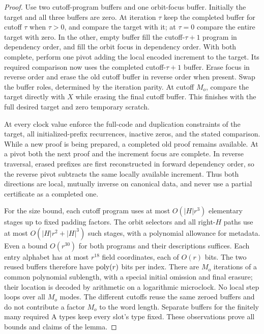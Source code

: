 \begin{proof}
Use two cutoff-program buffers and one orbit-focus buffer.
Initially the target and all three buffers are zero.
At iteration $\tau$ keep the completed buffer for cutoff $\tau$
when $\tau>0$, and compare the target with it; at $\tau=0$ compare
the entire target with zero.  In the other, empty buffer fill the
cutoff-$\tau+1$ program in dependency order, and fill the orbit focus
in dependency order.  With both complete, perform one pivot adding
the local encoded increment to the target.  Its required comparison
now uses the completed cutoff-$\tau+1$ buffer.  Erase focus in reverse
order and erase the old cutoff buffer in reverse order when present.
Swap the buffer roles, determined by the iteration parity.
At cutoff $M_o$, compare the target directly with $X$ while erasing
the final cutoff buffer.  This finishes with the full desired target
and zero temporary scratch.

At every clock value enforce the full-code and duplication constraints
of the target, all initialized-prefix recurrences, inactive zeros,
and the stated comparison.  While a new proof is being prepared, a
completed old proof remains available.  At a pivot both the next
proof and the increment focus are complete.  In reverse traversal,
erased prefixes are first reconstructed in forward dependency order,
so the reverse pivot subtracts the same locally available increment.
Thus both directions are local, mutually inverse on canonical data,
and never use a partial certificate as a completed one.

For the size bound, each cutoff program uses at most
$O(|H|r^3)$ elementary stages up to fixed padding factors.
The orbit selectors and all right-$H$ paths use at most
$O(|H|r^2+|H|^3)$ such stages, with a polynomial allowance for
metadata.  Even a bound $O(r^{30})$ for both programs and their
descriptions suffices.  Each entry alphabet has at most $r^{18}$
field coordinates, each of $O(r)$ bits.  The two reused buffers
therefore have $\operatorname{poly}(r)$ bits per index.  There are $M_o$ iterations
of a common polynomial sublength, with a special initial omission
and final erasure; their location is decoded by arithmetic on a
logarithmic microclock.  No local step loops over all $M_o$ modes.
The different cutoffs reuse the same zeroed buffers and do not
contribute a factor $M_o$ to the word length.  Separate buffers for
the finitely many required A types keep every slot's type fixed.
These observations prove all bounds and claims of the lemma.
\end{proof}

